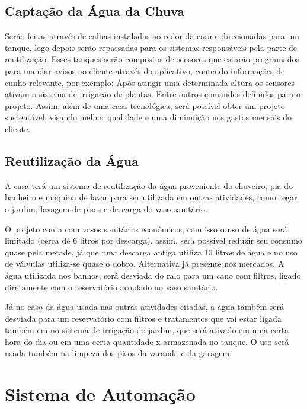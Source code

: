             \subsection{Captação da Água da Chuva}
                \par Serão feitas através  de calhas instaladas ao redor da casa e direcionadas para um tanque, logo depois serão repassadas para os sistemas responsáveis pela parte de reutilização. Esses tanques serão compostos de sensores que estarão programados para mandar avisos ao cliente através do aplicativo, contendo informações de cunho relevante, por exemplo: Após atingir uma determinada altura os sensores ativam o sistema de irrigação de plantas. Entre outros comandos definidos para o projeto. Assim, além de uma casa tecnológica, será possível obter um projeto sustentável, visando melhor qualidade e uma diminuição nos gastos mensais do cliente. \cite{ecycle}
                
            \subsection{Reutilização da Água}
                \par A casa terá um sistema de reutilização da água proveniente do chuveiro, pia do banheiro e máquina de lavar para ser utilizada em outras atividades, como regar o jardim, lavagem de pisos e descarga do vaso sanitário.
 	            \par O projeto conta com vasos sanitários econômicos, com isso o uso de água será limitado (cerca de 6 litros por descarga),  assim, será possível reduzir seu consumo quase pela metade, já que uma descarga antiga utiliza 10 litros de água e no uso de válvulas utiliza-se quase o dobro. Alternativa já presente nos mercados.  A água utilizada nos banhos, será desviada do ralo para um cano com filtros,  ligado diretamente com o reservatório acoplado ao vaso sanitário. \cite{sociedadedosol}
 	            \par Já no caso da água usada nas outras atividades citadas, a água também será desviada para um reservatório com filtros e tratamentos que vai estar ligada também em no sistema de irrigação do jardim, que será ativado em uma certa hora do dia ou em uma certa quantidade x armazenada no tanque. O uso será usada também na limpeza dos pisos da varanda e da garagem.
 	            
 	      \section{Sistema de Automação}
